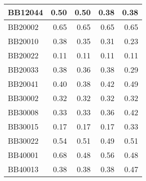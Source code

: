 \begin{table}[!htbp]
\begin{tabular}{|l|r|r|r|r|}
		\hline
		BB12044 & \cellcolor[rgb]{ .988,  1,  .992}0.50 & \cellcolor[rgb]{ .988,  1,  .992}0.50 & \cellcolor[rgb]{ .384,  .745,  .478}0.38 & \cellcolor[rgb]{ .384,  .745,  .478}0.38 \\
		\hline
		BB20002 & \cellcolor[rgb]{ .988,  1,  .992}0.65 & \cellcolor[rgb]{ .988,  1,  .992}0.65 & \cellcolor[rgb]{ .988,  1,  .992}0.65 & \cellcolor[rgb]{ .988,  1,  .992}0.65 \\
		\hline
		BB20010 & \cellcolor[rgb]{ .988,  1,  .992}0.38 & \cellcolor[rgb]{ .835,  .933,  .863}0.35 & \cellcolor[rgb]{ .686,  .871,  .733}0.31 & \cellcolor[rgb]{ .384,  .745,  .478}0.23 \\
		\hline
		BB20022 & \cellcolor[rgb]{ .988,  1,  .992}0.11 & \cellcolor[rgb]{ .988,  1,  .992}0.11 & \cellcolor[rgb]{ .988,  1,  .992}0.11 & \cellcolor[rgb]{ .988,  1,  .992}0.11 \\
		\hline
		BB20033 & \cellcolor[rgb]{ .988,  1,  .992}0.38 & \cellcolor[rgb]{ .835,  .933,  .863}0.36 & \cellcolor[rgb]{ .988,  1,  .992}0.38 & \cellcolor[rgb]{ .384,  .745,  .478}0.29 \\
		\hline
		BB20041 & \cellcolor[rgb]{ .502,  .792,  .58}0.40 & \cellcolor[rgb]{ .384,  .745,  .478}0.38 & \cellcolor[rgb]{ .624,  .843,  .682}0.42 & \cellcolor[rgb]{ .988,  1,  .992}0.49 \\
		\hline
		BB30002 & \cellcolor[rgb]{ .988,  1,  .992}0.32 & \cellcolor[rgb]{ .988,  1,  .992}0.32 & \cellcolor[rgb]{ .988,  1,  .992}0.32 & \cellcolor[rgb]{ .988,  1,  .992}0.32 \\
		\hline
		BB30008 & \cellcolor[rgb]{ .384,  .745,  .478}0.33 & \cellcolor[rgb]{ .384,  .745,  .478}0.33 & \cellcolor[rgb]{ .584,  .827,  .647}0.36 & \cellcolor[rgb]{ .988,  1,  .992}0.42 \\
		\hline
		BB30015 & \cellcolor[rgb]{ .384,  .745,  .478}0.17 & \cellcolor[rgb]{ .384,  .745,  .478}0.17 & \cellcolor[rgb]{ .384,  .745,  .478}0.17 & \cellcolor[rgb]{ .988,  1,  .992}0.33 \\
		\hline
		BB30022 & \cellcolor[rgb]{ .988,  1,  .992}0.54 & \cellcolor[rgb]{ .584,  .827,  .647}0.51 & \cellcolor[rgb]{ .384,  .745,  .478}0.49 & \cellcolor[rgb]{ .584,  .827,  .647}0.51 \\
		\hline
		BB40001 & \cellcolor[rgb]{ .988,  1,  .992}0.68 & \cellcolor[rgb]{ .384,  .745,  .478}0.48 & \cellcolor[rgb]{ .624,  .847,  .682}0.56 & \cellcolor[rgb]{ .384,  .745,  .478}0.48 \\
		\hline
		BB40013 & \cellcolor[rgb]{ .384,  .745,  .478}0.38 & \cellcolor[rgb]{ .384,  .745,  .478}0.38 & \cellcolor[rgb]{ .384,  .745,  .478}0.38 & \cellcolor[rgb]{ .988,  1,  .992}0.47 \\

\end{tabular}
\end{table}
